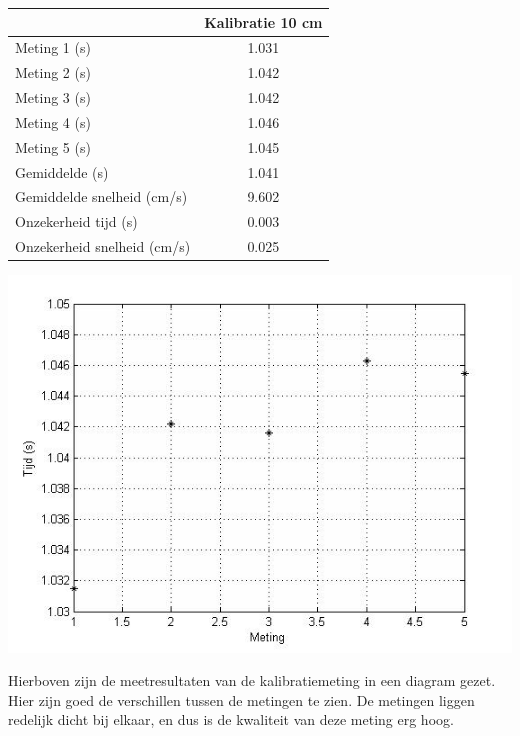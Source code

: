 \documentclass{thema}
\begin{document}
\begin{center}
\begin{tabular}{| l| c|}
\hline
    & Kalibratie 10 cm \\
\hline
   Meting 1 (s) & 1.031 \\
\hline
   Meting 2 (s) & 1.042 \\
\hline
   Meting 3 (s) & 1.042 \\
\hline
   Meting 4 (s) & 1.046 \\
\hline
   Meting 5 (s) & 1.045 \\
\hline
   Gemiddelde (s) & 1.041 \\
\hline
   Gemiddelde snelheid (cm/s) & 9.602 \\
\hline
   Onzekerheid tijd (s) & 0.003 \\
\hline
   Onzekerheid snelheid (cm/s) & 0.025 \\
\hline
\end{tabular}
\end{center}
\begin{center}
\includegraphics[width=150mm] {grafiekmeetresultaten.jpg}
\end{center}
Hierboven zijn de meetresultaten van de kalibratiemeting in een diagram gezet. Hier zijn goed de verschillen tussen de metingen te zien. De metingen liggen redelijk dicht bij elkaar, en dus is de kwaliteit van deze meting erg hoog.
\end{document}
